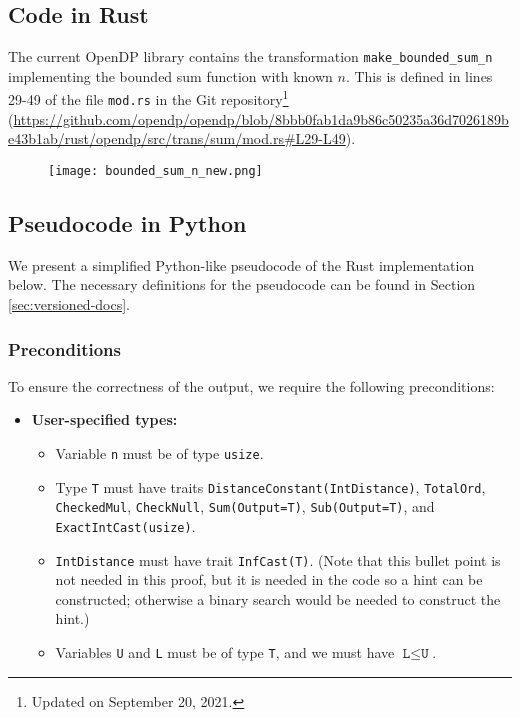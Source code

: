 \documentclass[11pt,a4paper]{article}
\theoremstyle{definition}
\begin{document}
\subsection{Code in Rust}
The current OpenDP library contains the transformation \texttt{make\_bounded\_sum\_n} implementing the bounded sum function with known $n$. This is defined in lines 29-49 of the file \texttt{mod.rs} in the Git repository\footnote{Updated on September 20, 2021.} (\url{https://github.com/opendp/opendp/blob/8bbb0fab1da9b86c50235a36d7026189be43b1ab/rust/opendp/src/trans/sum/mod.rs#L29-L49}).


\begin{figure}[ht]
    \texttt{[image: bounded\_sum\_n\_new.png]}
    \centering
    \label{fig:code}
\end{figure}

\subsection{Pseudocode in Python}
\label{sec:pseudocode}
We present a simplified Python-like pseudocode of the Rust implementation below. The necessary definitions for the pseudocode can be found in Section \ref{sec:versioned-docs}.

\subsubsection*{Preconditions}
To ensure the correctness of the output, we require the following preconditions:

\begin{itemize}
    \item \textbf{User-specified types:}
    \begin{itemize}
        \item Variable \texttt{n} must be of type \texttt{usize}.
        \item Type \texttt{T} must have traits \texttt{DistanceConstant(IntDistance)}, \texttt{TotalOrd}, \texttt{CheckedMul}, \texttt{CheckNull}, \texttt{Sum(Output=T)}, \texttt{Sub(Output=T)},  and \texttt{ExactIntCast(usize)}.
        \item \texttt{IntDistance} must have trait \texttt{InfCast(T)}. (Note that this bullet point is not needed in this proof, but it is needed in the code so a hint can be constructed; otherwise a binary search would be needed to construct the hint.)
        \item Variables \texttt{U} and \texttt{L} must be of type \texttt{T}, and we must have $\texttt{L} \leq \texttt{U}$.

\end{itemize}
\end{itemize}
\end{document}
